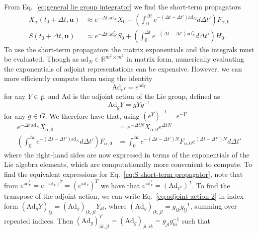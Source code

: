 From Eq.~\ref{eq:general lie group integrator} we find the short-term propagators
\begin{subequations} \label{eq:kinodynamic short term propagators raw}
	\begin{align}
		X_\alpha(t_0 + \Delta t, \mathbf{u}) & \approx e^{- \Delta t\ \text{ad}_N} X_0
			+ \left( \int_0^{\Delta t} e^{-(\Delta t - \Delta t') \text{ad}_N} d \Delta t' \right) F_{\alpha,0} \\
		S(t_0 + \Delta t, \mathbf{u}) & \approx e^{- \Delta t\ \text{ad}^*_N} S_0
			+ \left( \int_0^{\Delta t} e^{- (\Delta t - \Delta t') \text{ad}^*_N} d \Delta t' \right) H_0. \label{eq:S short-term propagator}
	\end{align}
\end{subequations}
To use the short-term propagators the matrix exponentials and the integrals must be evaluated. Though as $\text{ad}_N \in \mathbb{R}^{m^2 \times m^2}$ in matrix form, numerically evaluating the exponentials of adjoint representations can be expensive. However, we can more efficiently compute them using the identity \citep{rossmannLieGroupsIntroduction2006}
\begin{equation} \label{eq:Ad ad identity}
	\text{Ad}_{e^Y} = e^{\text{ad}_Y}
\end{equation}
for any $Y \in \mathfrak{g}$, and $\text{Ad}$ is the adjoint action of the Lie group, defined as
\begin{equation} \label{eq:adjoint action 2}
\text{Ad}_g Y = g Y g^{-1}
\end{equation} 
for any $g \in G$. We therefore have that, using $(e^{Y})^{-1} = e^{-Y}$
\begin{subequations} \label{eq:exp expressions for kinematic eom}
	\begin{align}
		e^{-\Delta t\ \text{ad}_N} X_{\alpha, 0} & = e^{- \Delta t N} X_{\alpha, 0} e^{\Delta t N} \\
		\left( \int_0^{\Delta t} e^{-(\Delta t - \Delta t') \text{ad}_N} d \Delta t' \right) F_{\alpha, 0} & = \int_0^{\Delta t} e^{- (\Delta t - \Delta t') N} F_{\alpha, 0} e^{(\Delta t - \Delta t') N}  d \Delta t'
	\end{align}
\end{subequations}
where the right-hand sides are now expressed in terms of the exponentials of the Lie algebra elements, which are computationally more convenient to compute. To find the equivalent expressions for Eq.~\ref{eq:S short-term propagator}, note that from $e^{\text{ad}^*_Y} = e^{(\text{ad}_Y)^T} = (e^{\text{ad}_Y})^T$ we have that $e^{\text{ad}^*_Y} = (\text{Ad}_{ e^Y })^T$. To find the transpose of the adjoint action, we can write Eq.~\ref{eq:adjoint action 2} in index form $(\text{Ad}_g Y)_{ij} = (\text{Ad}_g)_{ik, jl} Y_{kl}$, where $(\text{Ad}_g)_{ik, jl} = g_{ik} g^{-1}_{lj}$, summing over repeated indices. Then $(\text{Ad}_g)^T_{ik, jl} = (\text{Ad}_g)_{jl, ik} = g_{jl} g^{-1}_{ki}$ such that
